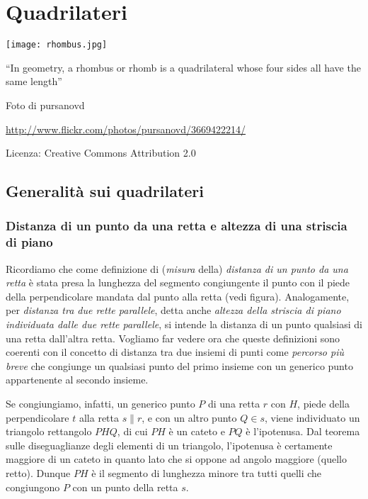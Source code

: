 \chapter{Quadrilateri}

\texttt{[image: rhombus.jpg]}
  \begin{center}
    {\large ``In geometry, a rhombus or rhomb is a quadrilateral whose four sides all have the same length''}\par
    Foto di pursanovd\par
    \url{http://www.flickr.com/photos/pursanovd/3669422214/}\par
    Licenza: Creative Commons Attribution 2.0\par
  \end{center}
\newpage

\section{Generalità sui quadrilateri}

\subsection{Distanza di un punto da una retta e altezza di una striscia di piano}

Ricordiamo che come definizione di (\emph{misura} della) \emph{distanza di un punto da una retta} è stata presa la lunghezza del segmento congiungente il punto con il piede della perpendicolare mandata dal punto alla retta (vedi figura). Analogamente, per \emph{distanza tra due rette parallele}, detta anche \emph{altezza della striscia di piano individuata dalle due rette parallele}, si intende la distanza di un punto qualsiasi di una retta dall'altra retta. Vogliamo far vedere ora che queste definizioni sono coerenti con il concetto di distanza tra due insiemi di punti come \emph{percorso più breve} che congiunge un qualsiasi punto del primo insieme con un generico punto appartenente al secondo insieme.

Se congiungiamo, infatti, un generico punto $P$ di una retta $r$ con $H$, piede della perpendicolare $t$ alla retta $s\parallel r$, e con un altro punto $Q\in s$, viene individuato un triangolo rettangolo $PHQ$, di cui $PH$ è un cateto e $PQ$ è l'ipotenusa. Dal teorema sulle diseguaglianze degli elementi di un triangolo, l'ipotenusa è certamente maggiore di un cateto in quanto lato che si oppone ad angolo maggiore (quello retto). Dunque $PH$ è il segmento di lunghezza minore tra tutti quelli che congiungono $P$ con un punto della retta $s$.

